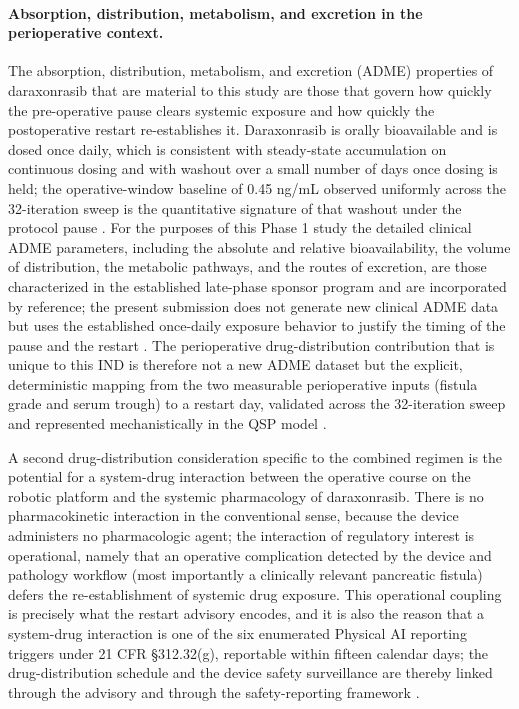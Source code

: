 \paragraph{Absorption, distribution, metabolism, and excretion in the perioperative context.}
The absorption, distribution, metabolism, and excretion (ADME) properties of
daraxonrasib that are material to this study are those that govern how quickly the
pre-operative pause clears systemic exposure and how quickly the postoperative
restart re-establishes it. Daraxonrasib is orally bioavailable and is dosed once
daily, which is consistent with steady-state accumulation on continuous dosing and
with washout over a small number of days once dosing is held; the operative-window
baseline of 0.45 ng/mL observed uniformly across the 32-iteration sweep is the
quantitative signature of that washout under the protocol pause \cite{onpremwhippl}.
For the purposes of this Phase 1 study the detailed clinical ADME parameters,
including the absolute and relative bioavailability, the volume of distribution,
the metabolic pathways, and the routes of excretion, are those characterized in
the established late-phase sponsor program and are incorporated by reference; the
present submission does not generate new clinical ADME data but uses the
established once-daily exposure behavior to justify the timing of the pause and the
restart \cite{daraxwhipple,phase1guidance}. The perioperative drug-distribution
contribution that is unique to this IND is therefore not a new ADME dataset but the
explicit, deterministic mapping from the two measurable perioperative inputs
(fistula grade and serum trough) to a restart day, validated across the
32-iteration sweep and represented mechanistically in the QSP model
\cite{qspmetpancre,onpremwhippl}.

A second drug-distribution consideration specific to the combined regimen is the
potential for a system-drug interaction between the operative course on the robotic
platform and the systemic pharmacology of daraxonrasib. There is no pharmacokinetic
interaction in the conventional sense, because the device administers no
pharmacologic agent; the interaction of regulatory interest is operational, namely
that an operative complication detected by the device and pathology workflow (most
importantly a clinically relevant pancreatic fistula) defers the re-establishment
of systemic drug exposure. This operational coupling is precisely what the restart
advisory encodes, and it is also the reason that a system-drug interaction is one of
the six enumerated Physical AI reporting triggers under 21 CFR \S 312.32(g),
reportable within fifteen calendar days; the drug-distribution schedule and the
device safety surveillance are thereby linked through the advisory and through the
safety-reporting framework \cite{onpremwhippl,cfr312paiuni}.

